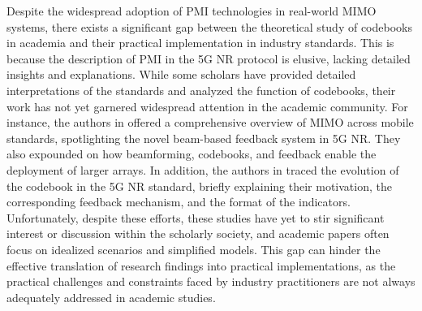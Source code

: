 \documentclass[lettersize,journal]{IEEEtran}
\begin{document}
Despite the widespread adoption of PMI technologies in real-world MIMO systems, there exists a significant gap between the theoretical study of codebooks in academia and their practical implementation in industry standards. This is because the description of PMI in the 5G NR protocol is elusive, lacking detailed insights and explanations. While some scholars have provided detailed interpretations of the standards and analyzed the function of codebooks, their work has not yet garnered widespread attention in the academic community. For instance, the authors in \cite{heathMag} offered a comprehensive overview of MIMO across mobile standards, spotlighting the novel beam-based feedback system in 5G NR. They also expounded on how beamforming, codebooks, and feedback enable the deployment of larger arrays. In addition, the authors in \cite{YinChina} traced the evolution of the codebook in the 5G NR standard, briefly explaining their motivation, the corresponding feedback mechanism, and the format of the indicators. Unfortunately, despite these efforts, these studies have yet to stir significant interest or discussion within the scholarly society, and academic papers often focus on idealized scenarios and simplified models. This gap can hinder the effective translation of research findings into practical implementations, as the practical challenges and constraints faced by industry practitioners are not always adequately addressed in academic studies. 
\end{document}
